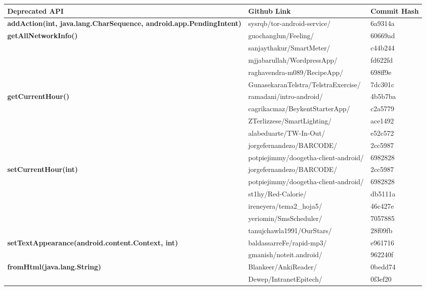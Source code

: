 \begin{longtable}{ |p{12em}|p{6em}|p{4em} | }
\hline
  \textbf{Deprecated API} & \textbf{Github Link} & \textbf{Commit Hash} \\ 
 \hline
 \textbf{addAction(int, java.lang.CharSequence, android.app.PendingIntent)} & sysrqb/tor-android-service/ & 6a9314a \\  
 \hline
 \multirow{5}{*}{\textbf{getAllNetworkInfo()}} & guochanglun/Feeling/ & 60669ad\\\cline{2-3}
    & sanjaythakur/SmartMeter/ & c44b244\\\cline{2-3}
    & mjjabarullah/WordpressApp/ & fd622fd\\\cline{2-3}
    & raghavendra-m089/RecipeApp/ & 698ff9e\\\cline{2-3}
    & GunasekaranTelstra/TelstraExercise/ & 7dc301c\\\cline{2-3}
 \hline
 \multirow{6}{*}{\textbf{getCurrentHour()}} & ramadani/intro-android/ & 4b5b7ba\\\cline{2-3}
 & cagrikacmaz/BeykentStarterApp/ & c2a5779\\\cline{2-3}
 & ZTerlizzese/SmartLighting/ & ace1492\\\cline{2-3}
 & alabeduarte/TW-In-Out/ & e52c572\\\cline{2-3}
 & jorgefernandezo/BARCODE/ & 2cc5987\\\cline{2-3}
 & potpiejimmy/doogetha-client-android/ & 6982828\\\cline{2-3}
 \hline
 \multirow{6}{*}{\textbf{setCurrentHour(int)}} & jorgefernandezo/BARCODE/ & 2cc5987\\\cline{2-3}
 & potpiejimmy/doogetha-client-android/ & 6982828\\\cline{2-3}
 & st1hy/Red-Calorie/ & db5111a\\\cline{2-3}
 & ireneyera/tema2_hoja5/ & 46c427e\\\cline{2-3}
 & yeriomin/SmsScheduler/ & 7057885\\\cline{2-3}
 & tanujchawla1991/OurStars/ & 28f09fb\\\cline{2-3}
 \hline
 \multirow{2}{*}{\textbf{setTextAppearance(android.content.Context, int)}} & baldassarreFe/rapid-mp3/ & e961716\\\cline{2-3}
 & gmanish/noteit.android/ & 962240f\\\cline{2-3}
 \hline
 \multirow{4}{*}{\textbf{fromHtml(java.lang.String)}} & Blankeer/AnkiReader/ & 0bedd74\\\cline{2-3}
 & Dewep/IntranetEpitech/ & 0f3ef20\\\cline{2-3}

\end{longtable}
